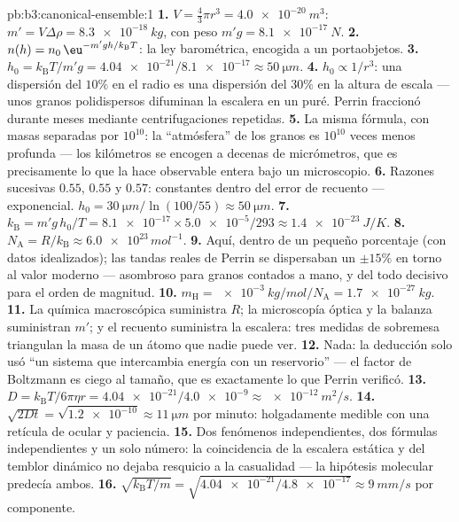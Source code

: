 \begin{solution}{pb:b3:canonical-ensemble:1}
\textbf{1.} $V = \tfrac43\pi r^3 = \qty{4.0e-20}{m^3}$: $m' = V
\Delta\rho = \qty{8.3e-18}{kg}$, con peso $m'g = \qty{8.1e-17}{N}$.
\textbf{2.} $n(h) = n_0\,\eu^{-m'gh/k_{\text{B}}T}$: la
ley barométrica, encogida a un portaobjetos.
\textbf{3.} $h_0 = k_{\text{B}}T/m'g = \num{4.04e-21}/\num{8.1e-17}
\approx \qty{50}{\micro m}$.
\textbf{4.} $h_0 \propto 1/r^3$: una dispersión del $10\%$ en el radio es
una dispersión del $30\%$ en la altura de escala --- unos granos
polidispersos difuminan la escalera en un puré. Perrin fraccionó durante
meses mediante centrifugaciones repetidas.
\textbf{5.} La misma fórmula, con masas separadas por $10^{10}$: la
``atmósfera'' de los granos es $10^{10}$ veces menos profunda --- los
kilómetros se encogen a decenas de micrómetros, que es precisamente lo que
la hace observable entera bajo un microscopio.
\textbf{6.} Razones sucesivas $0.55$, $0.55$ y $0.57$: constantes
dentro del error de recuento --- exponencial. $h_0 =
\qty{30}{\micro m}/\ln(100/55) \approx \qty{50}{\micro m}$.
\textbf{7.} $k_{\text{B}} = m'g\,h_0/T = \num{8.1e-17} \times
\num{5.0e-5}/293 \approx \qty{1.4e-23}{J/K}$.
\textbf{8.} $N_{\text{A}} = R/k_{\text{B}} \approx
\num{6.0e23}\,\unit{mol^{-1}}$.
\textbf{9.} Aquí, dentro de un pequeño porcentaje (con datos idealizados);
las tandas reales de Perrin se dispersaban un $\pm15\%$ en torno al valor
moderno --- asombroso para granos contados a mano, y del todo decisivo para
el orden de magnitud.
\textbf{10.} $m_{\text{H}} = \qty{e-3}{kg/mol}/N_{\text{A}} =
\qty{1.7e-27}{kg}$.
\textbf{11.} La química macroscópica suministra $R$; la microscopía óptica
y la balanza suministran $m'$; y el recuento suministra la escalera: tres
medidas de sobremesa triangulan la masa de un átomo que nadie puede
ver.
\textbf{12.} Nada: la deducción solo usó ``un sistema que intercambia
energía con un reservorio'' --- el factor de Boltzmann es ciego al tamaño,
que es exactamente lo que Perrin verificó.
\textbf{13.} $D = k_{\text{B}}T/6\pi\eta r =
\num{4.04e-21}/\num{4.0e-9} \approx \qty{e-12}{m^2/s}$.
\textbf{14.} $\sqrt{2Dt} = \sqrt{\num{1.2e-10}} \approx
\qty{11}{\micro m}$ por minuto: holgadamente medible con una
retícula de ocular y paciencia.
\textbf{15.} Dos fenómenos independientes, dos fórmulas independientes y
un solo número: la coincidencia de la escalera estática y del temblor
dinámico no dejaba resquicio a la casualidad --- la hipótesis molecular
predecía ambos.
\textbf{16.} $\sqrt{k_{\text{B}}T/m} = \sqrt{\num{4.04e-21}/
\num{4.8e-17}} \approx \qty{9}{mm/s}$ por componente.

\end{solution}
